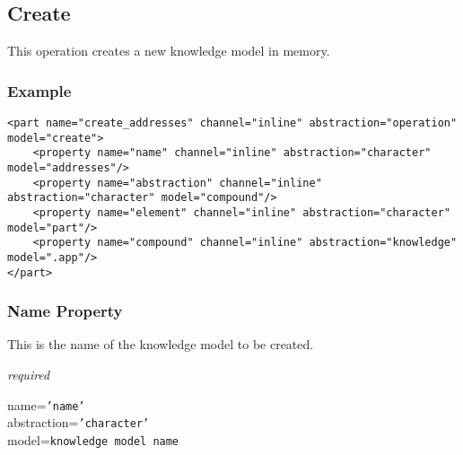%
%
%
%
%
%

\subsection{Create}
\label{create_heading}

This operation creates a new knowledge model in memory.

\subsubsection{Example}

\begin{scriptsize}
    \begin{verbatim}
<part name="create_addresses" channel="inline" abstraction="operation" model="create">
    <property name="name" channel="inline" abstraction="character" model="addresses"/>
    <property name="abstraction" channel="inline" abstraction="character" model="compound"/>
    <property name="element" channel="inline" abstraction="character" model="part"/>
    <property name="compound" channel="inline" abstraction="knowledge" model=".app"/>
</part>
    \end{verbatim}
\end{scriptsize}

\subsubsection{Name Property}

This is the name of the knowledge model to be created.

\emph{required}

name=\texttt{'name'}\\
abstraction=\texttt{'character'}\\
model=\texttt{knowledge model name}

